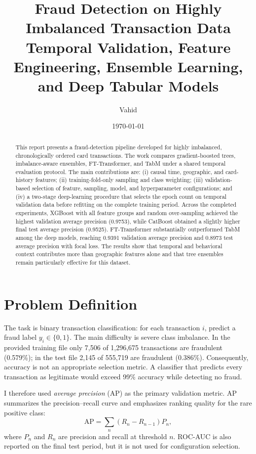\documentclass[11pt,a4paper]{article}
\title{Fraud Detection on Highly Imbalanced Transaction Data\\
\large Temporal Validation, Feature Engineering, Ensemble Learning, and Deep Tabular Models}
\author{Vahid}
\date{\today}
\newcommand{\ap}{\mathrm{AP}}
\begin{document}
\maketitle

\begin{abstract}
This report presents a fraud-detection pipeline developed for highly imbalanced, chronologically ordered card transactions. The work compares gradient-boosted trees, imbalance-aware ensembles, FT-Transformer, and TabM under a shared temporal evaluation protocol. The main contributions are: (i) causal time, geographic, and card-history features; (ii) training-fold-only sampling and class weighting; (iii) validation-based selection of feature, sampling, model, and hyperparameter configurations; and (iv) a two-stage deep-learning procedure that selects the epoch count on temporal validation data before refitting on the complete training period. Across the completed experiments, XGBoost with all feature groups and random over-sampling achieved the highest validation average precision (0.9753), while CatBoost obtained a slightly higher final test average precision (0.9525). FT-Transformer substantially outperformed TabM among the deep models, reaching 0.9391 validation average precision and 0.8973 test average precision with focal loss. The results show that temporal and behavioral context contributes more than geographic features alone and that tree ensembles remain particularly effective for this dataset.
\end{abstract}

\section{Problem Definition}

The task is binary transaction classification: for each transaction $i$, predict a fraud label $y_i\in\{0,1\}$. The main difficulty is severe class imbalance. In the provided training file only 7,506 of 1,296,675 transactions are fraudulent (0.579\%); in the test file 2,145 of 555,719 are fraudulent (0.386\%). Consequently, accuracy is not an appropriate selection metric. A classifier that predicts every transaction as legitimate would exceed 99\% accuracy while detecting no fraud.

I therefore used \emph{average precision} (AP) as the primary validation metric. AP summarizes the precision--recall curve and emphasizes ranking quality for the rare positive class:
\begin{equation}
    \ap = \sum_n (R_n-R_{n-1})P_n,
\end{equation}
where $P_n$ and $R_n$ are precision and recall at threshold $n$. ROC-AUC is also reported on the final test period, but it is not used for configuration selection.
\end{document}
